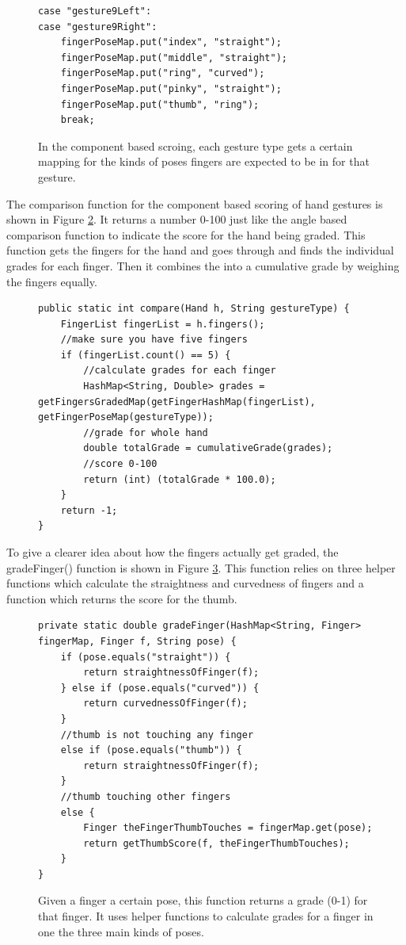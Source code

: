 \begin{figure}[H]
\centering
\begin{lstlisting}
case "gesture9Left":
case "gesture9Right":
	fingerPoseMap.put("index", "straight");
	fingerPoseMap.put("middle", "straight");
	fingerPoseMap.put("ring", "curved");
	fingerPoseMap.put("pinky", "straight");
	fingerPoseMap.put("thumb", "ring");
	break;
\end{lstlisting}
\caption[Finger Pose Mapping]{In the component based scroing, each gesture type gets a certain mapping for the kinds of poses fingers are expected to be in for that gesture.}
\label{fig:gesture9PoseSignature}
\end{figure}


The comparison function for the component based scoring of hand gestures is shown in Figure \ref{fig:compare2}. It returns a number 0-100 just like the angle based comparison function to indicate the score for the hand being graded. This function gets the fingers for the hand and goes through and finds the individual grades for each finger. Then it combines the into a cumulative grade by weighing the fingers equally. 
\begin{figure}[H]
\centering
\begin{lstlisting}
public static int compare(Hand h, String gestureType) {
	FingerList fingerList = h.fingers();
	//make sure you have five fingers
	if (fingerList.count() == 5) {
		//calculate grades for each finger
		HashMap<String, Double> grades = getFingersGradedMap(getFingerHashMap(fingerList), getFingerPoseMap(gestureType));
		//grade for whole hand
		double totalGrade = cumulativeGrade(grades);
		//score 0-100
		return (int) (totalGrade * 100.0);
	}
	return -1;
}
\end{lstlisting}
\caption[Component Based Comparison Function]{}
\label{fig:compare2}
\end{figure}

To give a clearer idea about how the fingers actually get graded, the gradeFinger() function is shown in Figure \ref{fig:gradeFinger}. This function relies on three helper functions which calculate the straightness and curvedness of fingers and a function which returns the score for the thumb. 
\begin{figure}[H]
\centering
\begin{lstlisting}
private static double gradeFinger(HashMap<String, Finger> fingerMap, Finger f, String pose) {
	if (pose.equals("straight")) {
		return straightnessOfFinger(f);
	} else if (pose.equals("curved")) {
		return curvednessOfFinger(f);
	}
	//thumb is not touching any finger
	else if (pose.equals("thumb")) {
		return straightnessOfFinger(f);
	}
	//thumb touching other fingers
	else {
		Finger theFingerThumbTouches = fingerMap.get(pose);
		return getThumbScore(f, theFingerThumbTouches);
	}
}
\end{lstlisting}
\caption[gradeFinger() Function]{Given a finger a certain pose, this function returns a grade (0-1) for that finger. It uses helper functions to calculate grades for a finger in one the three main kinds of poses.}
\label{fig:gradeFinger}
\end{figure}		

